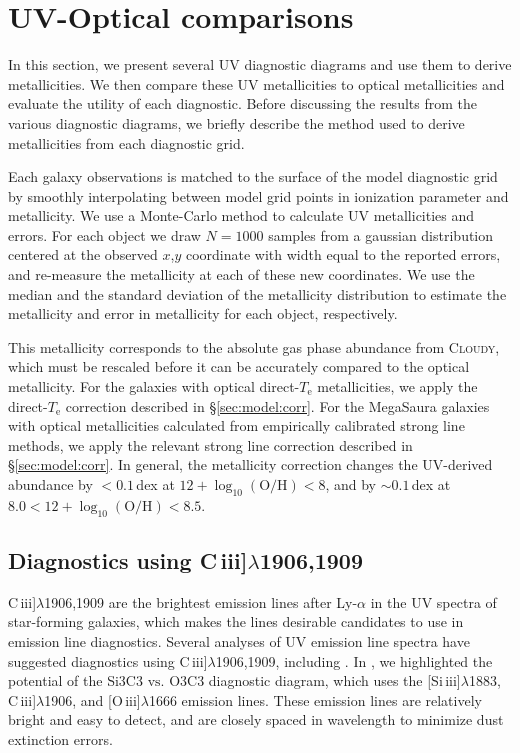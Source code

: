 \documentclass[preprint2]{aastex62}
\newcommand{\Cloudy}{\textsc{Cloudy}\xspace}
\newcommand{\oiii}{[O\,{\sc iii}]\xspace}
\newcommand{\SiuIII}{[Si\,{\sc iii}]\xspace}
\newcommand{\ciii}{C\,{\sc iii}]\xspace}
\newcommand\vs{\ensuremath{\mathrm{vs.}}\xspace}
\newcommand{\logten}{\ensuremath{\log_{10}}}
\newcommand{\logOH}{\ensuremath{\logten (\mathrm{O}/\mathrm{H})}\xspace}
\newcommand{\mage}{{\sc Meg}a{\sc S}a{\sc ura}\xspace}
\newcommand{\Te}{\ensuremath{T_{\mathrm{e}}}\xspace}
\begin{document}
\section{UV-Optical comparisons}\label{sec:UVOpt}

In this section, we present several UV diagnostic diagrams and use them to derive metallicities. We then compare these UV metallicities to optical metallicities and evaluate the utility of each diagnostic. Before discussing the results from the various diagnostic diagrams, we briefly describe the method used to derive metallicities from each diagnostic grid. 

Each galaxy observations is matched to the surface of the model diagnostic grid by smoothly interpolating between model grid points in ionization parameter and metallicity. We use a Monte-Carlo method to calculate UV metallicities and errors. For each object we draw $N=1000$ samples from a gaussian distribution centered at the observed $x$,$y$ coordinate with width equal to the reported errors, and re-measure the metallicity at each of these new coordinates. We use the median and the standard deviation of the metallicity distribution to estimate the metallicity and error in metallicity for each object, respectively. 

This metallicity corresponds to the absolute gas phase abundance from \Cloudy, which must be rescaled before it can be accurately compared to the optical metallicity. For the \citet{Berg+2016} galaxies with optical direct-\Te metallicities, we apply the direct-\Te correction described in \S\ref{sec:model:corr}. For the \mage galaxies with optical metallicities calculated from empirically calibrated strong line methods, we apply the relevant strong line correction described in \S\ref{sec:model:corr}. In general, the metallicity correction changes the UV-derived abundance by $<0.1$\,dex at $12 + \logOH < 8$, and by ${\sim}0.1$\,dex at $8.0 < 12 + \logOH < 8.5$.

\subsection{Diagnostics using \ciii$\lambda$1906,1909}\label{sec:UVOpt:C}

\ciii$\lambda$1906,1909 are the brightest emission lines after Ly-$\alpha$ in the UV spectra of star-forming galaxies, which makes the lines desirable candidates to use in emission line diagnostics. Several analyses of UV emission line spectra have suggested diagnostics using \ciii$\lambda$1906,1909, including \citet{Feltre+2016, Jaskot+2016, Byler+2018}. In \citet{Byler+2018}, we highlighted the potential of the Si3C3 \vs O3C3 diagnostic diagram, which uses the \SiuIII$\lambda$1883, \ciii$\lambda$1906, and \oiii$\lambda$1666 emission lines. These emission lines are relatively bright and easy to detect, and are closely spaced in wavelength to minimize dust extinction errors. 
\end{document}

